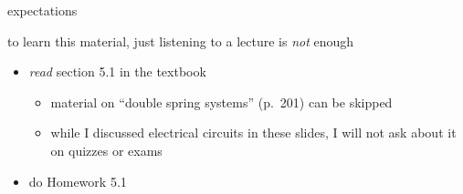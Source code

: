 \documentclass[dvipsnames,colorlinks]{beamer}
\begin{document}
\begin{frame}{expectations}

to learn this material, just listening to a lecture is \emph{not} enough
     \begin{itemize}
     \item \emph{read} section 5.1 in the textbook
         \begin{itemize}
         \item material on ``double spring systems'' (p.~201) can be skipped
         \item while I discussed electrical circuits in these slides, I will not ask about it on quizzes or exams
         \end{itemize}
     \item do Homework 5.1
     \end{itemize}
\end{frame}
\end{document}
